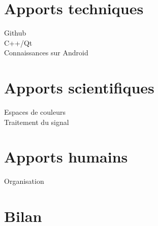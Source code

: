 \section{Apports techniques}

Github\\
C++/Qt\\
Connaissances sur Android 

\section{Apports scientifiques}

Espaces de couleurs\\
Traitement du signal

\section{Apports humains}

Organisation

\section{Bilan}

